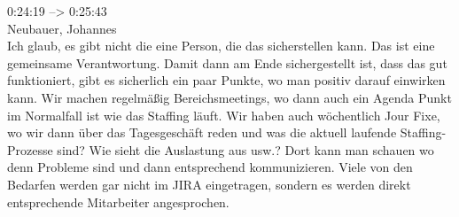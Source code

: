 0:24:19 --> 0:25:43\\
Neubauer, Johannes\\
Ich glaub, es gibt nicht die eine Person, die das sicherstellen kann. Das ist eine gemeinsame Verantwortung. Damit dann am Ende sichergestellt ist, dass das gut funktioniert, gibt es sicherlich ein paar Punkte, wo man positiv darauf einwirken kann. Wir machen regelmäßig Bereichsmeetings, wo dann auch ein Agenda Punkt im Normalfall ist wie das Staffing läuft. Wir haben auch wöchentlich Jour Fixe, wo wir dann über das Tagesgeschäft reden und was die aktuell laufende Staffing-Prozesse sind? Wie sieht die Auslastung aus usw.? Dort kann man schauen wo denn Probleme sind und dann entsprechend kommunizieren. Viele von den Bedarfen werden gar nicht im JIRA eingetragen, sondern es werden direkt entsprechende Mitarbeiter angesprochen.\\
\newpage
